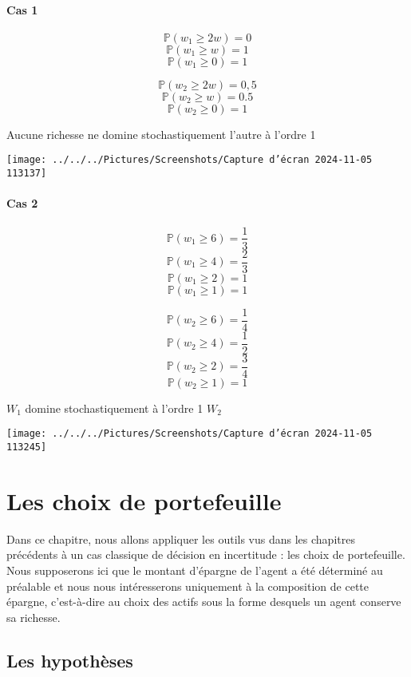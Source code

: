 \documentclass[a4paper, 12pt]{report}
\begin{document}
\subsubsection{Cas 1}
\[ \mathbb{P}(w_1  \geq  2w) =0 \]
\[ \mathbb{P}(w_1  \geq  w) = 1 \]
\[ \mathbb{P}(w_1  \geq  0) = 1 \]

\[ \mathbb{P}(w_2  \geq  2w) =0,5 \]
\[ \mathbb{P}(w_2  \geq  w) = 0.5 \]
\[ \mathbb{P}(w_2  \geq  0) = 1 \]

Aucune richesse ne domine stochastiquement l'autre à l'ordre 1

\begin{center}
	\texttt{[image: ../../../Pictures/Screenshots/Capture d'écran 2024-11-05 113137]}
\end{center}

\subsubsection{Cas 2}

\[ \mathbb{P}(w_1  \geq  6) = \frac{1}{3} \]
\[ \mathbb{P}(w_1  \geq  4) = \frac{2}{3} \]
\[ \mathbb{P}(w_1  \geq  2) = 1 \]
\[ \mathbb{P}(w_1  \geq  1) = 1 \]

\[ \mathbb{P}(w_2  \geq  6) = \frac{1}{4} \]
\[ \mathbb{P}(w_2  \geq  4) = \frac{1}{2} \]
\[ \mathbb{P}(w_2  \geq  2) = \frac{3}{4} \]
\[ \mathbb{P}(w_2  \geq  1) = 1 \]

\(W_1\) domine stochastiquement à l'ordre 1 \(W_2\)

\begin{center}
	\texttt{[image: ../../../Pictures/Screenshots/Capture d'écran 2024-11-05 113245]}
\end{center}

\chapter{Les choix de portefeuille}

Dans ce chapitre, nous allons appliquer les outils vus dans les chapitres précédents à un cas classique de décision en incertitude : les choix de portefeuille. Nous supposerons ici que le montant d'épargne de l'agent a été déterminé au préalable et nous nous intéresserons uniquement à la composition de cette épargne, c'est-à-dire au choix des actifs sous la forme desquels un agent conserve sa richesse.

\section{Les hypothèses}
\end{document}
